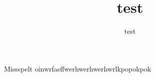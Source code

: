 \documentclass[12pt]{article}
\author{test}
\title{test}
\begin{document}
  Missspelt
  oinwrfasffwerhwerhwerhwrlkpopokpok
\end{document}
